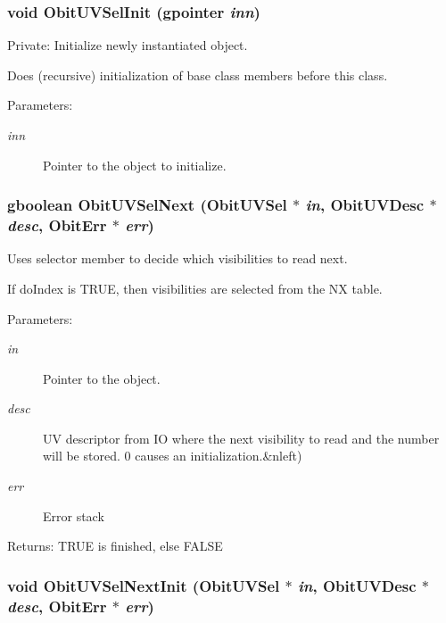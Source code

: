 \subsubsection{\setlength{\rightskip}{0pt plus 5cm}void Obit\-UVSel\-Init (gpointer {\em inn})}\label{ObitUVSel_8c_a3}


Private: Initialize newly instantiated object. 

Does (recursive) initialization of base class members before this class. \begin{Desc}
\item[Parameters:]
\begin{description}
\item[{\em inn}]Pointer to the object to initialize. \end{description}
\end{Desc}
\subsubsection{\setlength{\rightskip}{0pt plus 5cm}gboolean Obit\-UVSel\-Next ({\bf Obit\-UVSel} $\ast$ {\em in}, {\bf Obit\-UVDesc} $\ast$ {\em desc}, {\bf Obit\-Err} $\ast$ {\em err})}\label{ObitUVSel_8c_a15}


Uses selector member to decide which visibilities to read next. 

If do\-Index is TRUE, then visibilities are selected from the NX table. \begin{Desc}
\item[Parameters:]
\begin{description}
\item[{\em in}]Pointer to the object. \item[{\em desc}]UV descriptor from IO where the next visibility to read and the number will be stored. 0 causes an initialization.\&nleft) \item[{\em err}]Error stack \end{description}
\end{Desc}
\begin{Desc}
\item[Returns:]TRUE is finished, else FALSE \end{Desc}
\subsubsection{\setlength{\rightskip}{0pt plus 5cm}void Obit\-UVSel\-Next\-Init ({\bf Obit\-UVSel} $\ast$ {\em in}, {\bf Obit\-UVDesc} $\ast$ {\em desc}, {\bf Obit\-Err} $\ast$ {\em err})}\label{ObitUVSel_8c_a14}



